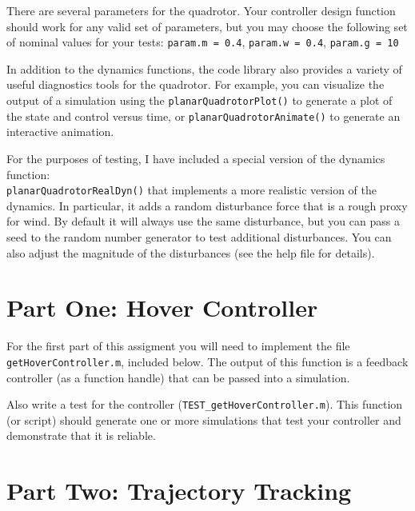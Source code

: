 \par
There are several parameters for the quadrotor. Your controller design function
should work for any valid set of parameters, but you may choose the following
set of nominal values for your tests:
\texttt{param.m = 0.4}, \texttt{param.w = 0.4}, \texttt{param.g = 10}

\par
In addition to the dynamics functions, the code library also provides a variety
of useful diagnostics tools for the quadrotor. For example, you can visualize the
output of a simulation using the
\texttt{planarQuadrotorPlot()} to generate a plot of the state and control versus time,
or \texttt{planarQuadrotorAnimate()} to generate an interactive animation.

\par
For the purposes of testing, I have included a special version of the dynamics
function:\\
\texttt{planarQuadrotorRealDyn()} that implements a more realistic
version of the dynamics. In particular, it adds a random disturbance force that
is a rough proxy for wind. By default it will always use the same disturbance,
but you can pass a seed to the random number generator to test additional disturbances.
You can also adjust the magnitude of the disturbances (see the help file for details).


\section*{Part One: Hover Controller}

For the first part of this assigment you will need to implement the file
\texttt{getHoverController.m}, included below. The output of this function is
a feedback controller (as a function handle) that can be passed into a simulation.

Also write a test for the controller (\texttt{TEST\_getHoverController.m}).
This function (or script) should generate one or more simulations that test
your controller and demonstrate that it is reliable.

\pagebreak


\section*{Part Two: Trajectory Tracking}



